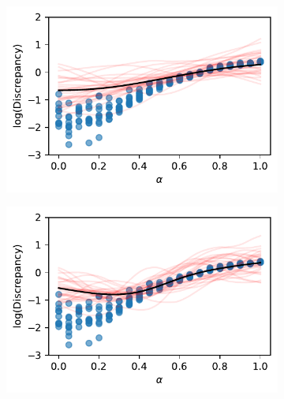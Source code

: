 \begin{figure}[htbp]
    \centering
    \begin{subfigure}[b]{0.5\textwidth}
        \centering
        \includegraphics[width=\textwidth]{
            ../champagne_GP_images/initial_alpha_slice_log_discrep.pdf
        }
    \end{subfigure}%
    \hfill%
    \begin{subfigure}[b]{0.5\textwidth}
        \centering
        \includegraphics[width=\textwidth]{
            ../champagne_GP_images/alpha_slice_500_bolfi_updates_log_discrep.pdf
        }
    \end{subfigure}
    \hfill%
    \begin{subfigure}[b]{0.5\textwidth}
        \centering

\end{subfigure}
\end{figure}
